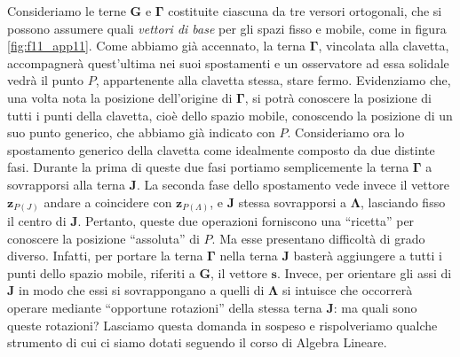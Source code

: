 \noindent Consideriamo le terne 
$\bm G$
e $\bm \Gamma$
costituite ciascuna 
da tre versori ortogonali, che si possono  
assumere quali {\em vettori di base} per
gli spazi fisso e mobile, come in figura \ref{fig:f11_app11}.
Come abbiamo gi\`a accennato, la terna $\bm{ \Gamma}$, vincolata alla clavetta,
accompagner\`a quest'ultima nei suoi spostamenti e un osservatore
ad essa solidale vedr\`a il punto $P$, appartenente alla clavetta stessa, 
stare fermo.
Evidenziamo che, una volta nota la posizione dell'origine di $\bm \Gamma$,
si potr\`a conoscere la posizione di tutti i punti della clavetta, cio\`e
dello spazio mobile,
conoscendo la posizione di un suo punto generico,
che abbiamo gi\`a indicato con $P$. 
Consideriamo ora lo spostamento generico della clavetta
come idealmente composto da due distinte fasi.
Durante la prima di queste due fasi portiamo semplicemente 
la terna $\bm \Gamma$ a sovrapporsi alla terna $\bm J$.
La seconda fase dello spostamento
vede invece il vettore 
${{\bm z}}_{\scriptscriptstyle{P(J)}}$ andare a coincidere con 
${{\bm z}}_{\scriptscriptstyle{P(\Lambda)}}$, e $\bm J$
stessa sovrapporsi a $\bm \Lambda$, lasciando fisso il centro di $\bm J$.
Pertanto, queste due operazioni
forniscono una ``ricetta''
per conoscere la posizione ``assoluta'' di $P$.
Ma esse presentano difficolt\`a di grado diverso.
Infatti, per portare la terna $\bm\Gamma$ nella terna $\bm J$
baster\`a aggiungere a tutti i punti
dello spazio mobile,
riferiti a $\bm G$, il vettore
${\bm{s}}$.  Invece, per orientare gli assi
di $\bm J$ in modo che essi si sovrappongano a quelli
di $\bm \Lambda$ si intuisce che 
occorrer\`a
operare mediante ``opportune rotazioni'' della stessa terna $\bm J$:
ma quali sono queste rotazioni?
Lasciamo questa domanda in sospeso e rispolveriamo qualche strumento
di cui ci siamo dotati
seguendo il corso di Algebra Lineare.  

